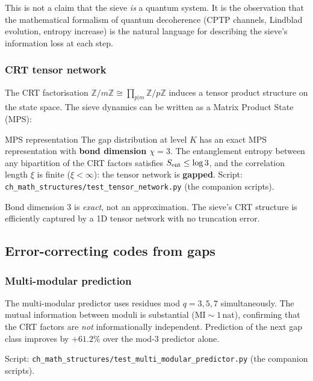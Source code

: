 \documentclass[12pt,a4paper]{article}
\begin{document}
This is not a claim that the sieve \emph{is} a quantum system.
It is the observation that the mathematical formalism of quantum
decoherence (CPTP channels, Lindblad evolution, entropy increase)
is the natural language for describing the sieve's information loss
at each step.

\subsubsection{CRT tensor network}

The CRT factorisation $\mathbb{Z}/m\mathbb{Z} \cong
\prod_{p|m} \mathbb{Z}/p\mathbb{Z}$ induces a tensor product
structure on the state space. The sieve dynamics can be written as
a Matrix Product State (MPS):

\begin{thmbox}{MPS representation}
\label{thm:mps}
The gap distribution at level $K$ has an exact MPS representation
with \textbf{bond dimension $\chi = 3$}. The entanglement entropy
between any bipartition of the CRT factors satisfies
$S_{\rm ent} \leq \log 3$, and the correlation length $\xi$ is
finite ($\xi < \infty$): the tensor network is \textbf{gapped}.
Script: \texttt{ch\_math\_structures/test\_tensor\_network.py} (the companion scripts).
\end{thmbox}

Bond dimension 3 is \emph{exact}, not an approximation. The sieve's
CRT structure is efficiently captured by a 1D tensor network with
no truncation error.


\subsection{Error-correcting codes from gaps}
\label{sec:ms_codes}

\subsubsection{Multi-modular prediction}

The multi-modular predictor uses residues mod $q = 3, 5, 7$
simultaneously. The mutual information between moduli is substantial
($\mathrm{MI} \sim 1$\,nat), confirming that the CRT factors are
\emph{not} informationally independent. Prediction of the next gap
class improves by $+61.2\%$ over the mod-3 predictor alone.

Script: \texttt{ch\_math\_structures/test\_multi\_modular\_predictor.py} (the companion scripts).
\end{document}
